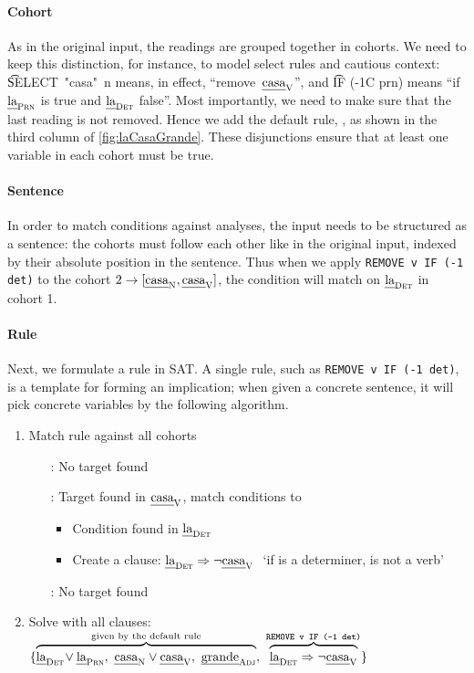 \paragraph{Cohort} As in the original input, the readings are grouped together in cohorts. We need to keep this distinction, for instance, to model {\sc select} rules and cautious context:
\t{SELECT~"casa"~n} means, in effect, ``remove~$\text{\em casa}_{\text{\sc V}}$'', and \t{IF (-1C prn)} means ``if $\text{\em la}_{\text{\sc Prn}}$ is true and $\text{\em la}_{\text{\sc Det}}$ false''.
%
Most importantly, we need to make sure that the last reading is not removed. Hence we add the default rule, , as shown in the third column of \ref{fig:laCasaGrande}.
These disjunctions ensure that at least one variable in each cohort must be true.



\paragraph{Sentence}
In order to match conditions against analyses, the input needs to be structured as a sentence: the cohorts must follow each other like in the original input, indexed by their absolute position in the sentence. Thus when we apply \texttt{REMOVE v IF (-1 det)} to the cohort $2 \rightarrow [\text{\em casa}_{\text{\sc N}} , \text{\em casa}_{\text{\sc V}}]$, the condition will match on $\text{\em la}_{\text{\sc Det}}$ in cohort 1.


\paragraph{Rule}

Next, we formulate a rule in SAT. A single rule, such as \texttt{REMOVE v IF (-1 det)}, is a template for forming an implication; when given a concrete sentence, it will pick concrete variables by the following algorithm.

\begin{enumerate}
\item Match rule against all cohorts
 \begin{itemize}
    \item[\la:] No target found
    \item[\casa:] Target found in $\text{\em casa}_{\text{\sc V}}$, match conditions to \la
      \begin{itemize}
       \item Condition found in $\text{\em la}_{\text{\sc Det}}$
       \item Create a clause: $\text{\em la}_{\text{\sc Det}} \Rightarrow \neg \text{\em casa}_{\text{\sc V}} \ $ `if \la{} is a determiner, \casa{} is not a verb'
      \end{itemize}
    \item[\grande:] No target found
  \end{itemize}
\item Solve with all clauses:
  $\{ \ob{\laDet \! \vee \laPrn, \ \casaN \vee \casaV, \  \grandeAdj}^{\text{given by the default rule}}, \
      \ob{\laDet \Rightarrow \neg \casaV}^{\t{REMOVE v IF (-1 det)}} \}$
\end{enumerate}

